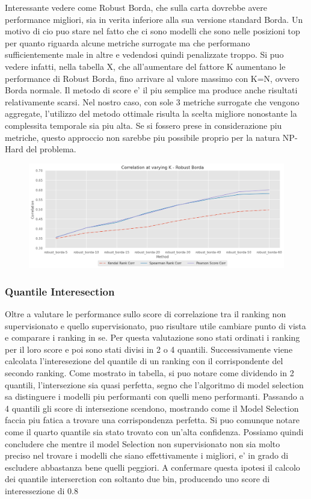Interessante vedere come Robust Borda, che sulla carta dovrebbe avere performance migliori, sia in verita inferiore alla sua versione standard Borda. Un motivo di cio puo stare nel fatto che ci sono modelli che sono nelle posizioni top per quanto riguarda alcune metriche surrogate ma che performano sufficientemente male in altre e vedendosi quindi penalizzate troppo.
Si puo vedere infatti, nella tabella X, che all'aumentare del fattore K aumentano le performance di Robust Borda, fino arrivare al valore massimo con K=N, ovvero Borda normale.
Il metodo di score e' il piu semplice ma produce anche risultati relativamente scarsi. Nel nostro caso, con sole 3 metriche surrogate che vengono aggregate, l'utilizzo del metodo ottimale risulta la scelta migliore nonostante la complessita temporale sia piu alta. Se si fossero prese in considerazione piu metriche, questo approccio non sarebbe piu possibile proprio per la natura NP-Hard del problema.

\begin{figure}[t]
\includegraphics[width=14cm, scale=1]{images/varying-k}
\centering
\end{figure}

\subsubsection{Quantile Interesection}
Oltre a valutare le performance sullo score di correlazione tra il ranking non supervisionato e quello supervisionato, puo risultare utile cambiare punto di vista e comparare i ranking in se.
Per questa valutazione sono stati ordinati i ranking per il loro score e poi sono stati divisi in 2 o 4 quantili. Successivamente viene calcolata l'interesezione del quantile di un ranking con il corrispondente del secondo ranking.
Come mostrato in tabella, si puo notare come dividendo in 2 quantili, l'intersezione sia quasi perfetta, segno che l'algoritmo di model selection sa distinguere i modelli piu performanti con quelli meno performanti.
Passando a 4 quantili gli score di intersezione scendono, mostrando come il Model Selection faccia piu fatica a trovare una corrispondenza perfetta. Si puo comunque notare come il quarto quantile sia stato trovato con un'alta confidenza.
Possiamo quindi concludere che mentre il model Selection non supervisionato non sia molto preciso nel trovare i modelli che siano effettivamente i migliori, e' in grado di escludere abbastanza bene quelli peggiori. A confermare questa ipotesi il calcolo dei quantile interserction con soltanto due bin, producendo uno score di interessezione di \(0.8\)

